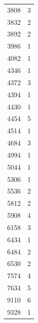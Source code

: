 \begin{table}[h]
{\begin{tabular}{lr}
            3808                 & 3                      \\
            3832                 & 2                      \\
            3892                 & 2                      \\
            3986                 & 1                      \\
            4082                 & 1                      \\
            4346                 & 1                      \\
            4372                 & 3                      \\
            4394                 & 1                      \\
            4430                 & 1                      \\
            4454                 & 5                      \\
            4514                 & 1                      \\
            4684                 & 3                      \\
            4994                 & 1                      \\
            5044                 & 1                      \\
            5306                 & 1                      \\
            5536                 & 2                      \\
            5812                 & 2                      \\
            5908                 & 4                      \\
            6158                 & 3                      \\
            6434                 & 1                      \\
            6484                 & 2                      \\
            6530                 & 2                      \\
            7574                 & 4                      \\
            7634                 & 5                      \\
            9110                 & 6                      \\
            9328                 & 1                      \\

\end{tabular}}
\end{table}
